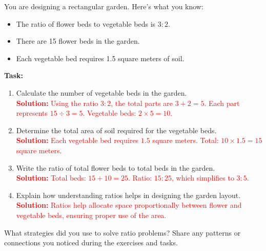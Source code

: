 \documentclass[12pt]{article}
\begin{document}
\begin{tcolorbox}[colframe=black!60, colback=white, 
coltitle=black, colbacktitle=black!15, fonttitle=\bfseries\Large, 
title=Performance Task: Designing a Garden, halign title=center, left=10pt, right=10pt, top=10pt, bottom=80pt]
You are designing a rectangular garden. Here’s what you know:
\begin{itemize}
    \item The ratio of flower beds to vegetable beds is \(3:2\).
    \item There are 15 flower beds in the garden.
    \item Each vegetable bed requires 1.5 square meters of soil.
\end{itemize}

\textbf{Task:}
\begin{enumerate}[itemsep=4em]
    \item Calculate the number of vegetable beds in the garden.\\
    \textcolor{red}{\textbf{Solution:} Using the ratio \(3:2\), the total parts are \(3 + 2 = 5\). Each part represents \(15 \div 3 = 5\). Vegetable beds: \(2 \times 5 = 10\).}

    \item Determine the total area of soil required for the vegetable beds.\\
    \textcolor{red}{\textbf{Solution:} Each vegetable bed requires \(1.5\) square meters. Total: \(10 \times 1.5 = 15\) square meters.}

    \item Write the ratio of total flower beds to total beds in the garden.\\
    \textcolor{red}{\textbf{Solution:} Total beds: \(15 + 10 = 25\). Ratio: \(15:25\), which simplifies to \(3:5\).}

    \item Explain how understanding ratios helps in designing the garden layout.\\
    \textcolor{red}{\textbf{Solution:} Ratios help allocate space proportionally between flower and vegetable beds, ensuring proper use of the area.}
\end{enumerate}
\end{tcolorbox}

\begin{tcolorbox}[colframe=black!60, colback=white, 
coltitle=black, colbacktitle=black!15, fonttitle=\bfseries\Large, 
title=Reflection, halign title=center, left=10pt, right=10pt, top=10pt, bottom=100pt]
What strategies did you use to solve ratio problems? Share any patterns or connections you noticed during the exercises and tasks.
\end{tcolorbox}
\end{document}
